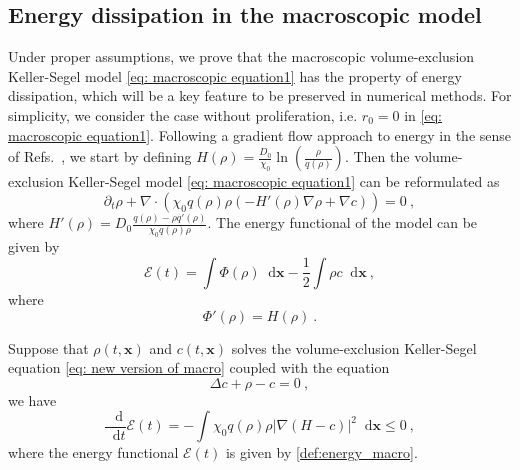\documentclass[review,onefignum,onetabnum]{siamart220329}
\newcommand {\bx} { {\mathbf{x}} }
\newcommand*\diff{\mathop{}\!\mathrm{d}}
\begin{document}
\subsection{Energy dissipation in the macroscopic model} \label{subsec:energy}
{Under proper assumptions, we prove that the macroscopic volume-exclusion Keller-Segel model \cref{eq: macroscopic equation1} has the property of energy dissipation, which will be a key feature to be preserved in numerical methods. 
{ For simplicity, we consider the case without proliferation, i.e. $r_0 = 0$ in \cref{eq: macroscopic equation1}. 
}
Following a gradient flow approach to energy in the sense of Refs.~\cite{calvez2006volume,carrillo2001entropy,de2018energy}, we start by defining $H(\rho) = \frac{D_0}{\chi_0}\ln\left(\frac{\rho}{q(\rho)}\right)$. }%
Then the volume-exclusion Keller-Segel model \cref{eq: macroscopic equation1} can be reformulated as 
\begin{equation}
    \partial_t\rho+\nabla\cdot(\chi_0 q(\rho)\rho(-H'(\rho)\nabla\rho+\nabla c))= 0\ , \label{eq: new version of macro}
\end{equation}
where $H'(\rho)=D_0\frac{q(\rho)-\rho q'(\rho)}{\chi_0 q(\rho)\rho}$.
The energy functional of the model can be given by {{
\begin{equation}\label{def:energy_macro}
    \mathcal{E}(t)=\int\Phi(\rho)\diff \mathbf{x}-\frac{1}{2}\int\rho c\diff \mathbf{x}\ ,
\end{equation}
}}
where 
\begin{equation}\label{functionPhi}
    \Phi'(\rho)=H(\rho)\ .
\end{equation}


\begin{proposition}\label{prop:energy}
Suppose that $\rho(t,\mathbf{x})$ and $c(t,\mathbf{x})$ solves the volume-exclusion Keller-Segel equation \cref{eq: new version of macro} coupled with the equation
\begin{equation}\label{elliptic_c}
   \Delta c + \rho - c = 0\ , 
\end{equation}
we have
\begin{equation}
    \frac{\diff}{\diff t}\mathcal{E}(t)=-\int \chi_0 q(\rho)\rho|\nabla(H-c)|^2\diff \bx\leq 0\ ,
\end{equation}
where the energy functional $\mathcal{E}(t)$ is given by \cref{def:energy_macro}.
\end{proposition}
\end{document}
